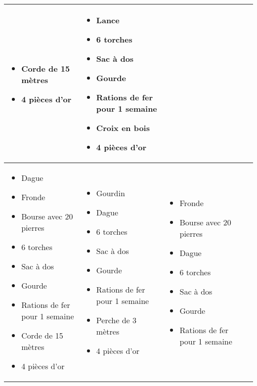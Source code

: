 \begin{tabularx}{\textwidth}{|X|X|X|X|X|}
\begin{itemize}
    \item Corde de 15 mètres
    \item 4 pièces d'or
  \end{itemize}
  &
  \begin{itemize}
    \item Lance
    \item 6 torches
    \item Sac à dos
    \item Gourde
    \item Rations de fer pour 1 semaine
    \item Croix en bois
    \item 4 pièces d'or
  \end{itemize}
  \\\hline

  \begin{itemize}
    \item Dague
    \item Fronde
    \item Bourse avec 20 pierres
    \item 6 torches
    \item Sac à dos
    \item Gourde
    \item Rations de fer pour 1 semaine
    \item Corde de 15 mètres
    \item 4 pièces d'or
  \end{itemize}
  &
  \begin{itemize}
    \item Gourdin
    \item Dague
    \item 6 torches
    \item Sac à dos
    \item Gourde
    \item Rations de fer pour 1 semaine
    \item Perche de 3 mètres
    \item 4 pièces d'or
  \end{itemize}
  &
  \begin{itemize}
    \item Fronde
    \item Bourse avec 20 pierres
    \item Dague
    \item 6 torches
    \item Sac à dos
    \item Gourde
    \item Rations de fer pour 1 semaine

\end{itemize}
\end{tabularx}
